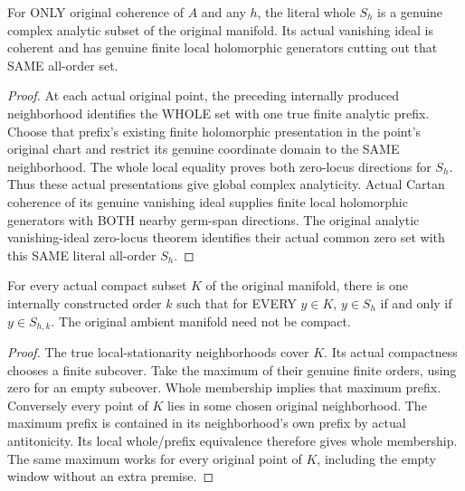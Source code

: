\begin{theorem}
\label{hir:actual-ambient-hs-whole-superlevel-analytic}
\leanok
For ONLY original coherence of $A$ and any $h$, the literal whole $S_h$
is a genuine complex analytic subset of the original manifold. Its actual
vanishing ideal is coherent and has genuine finite local holomorphic
generators cutting out that SAME all-order set.
\end{theorem}
\begin{proof}
At each actual original point, the preceding internally produced neighborhood
identifies the WHOLE set with one true finite analytic prefix. Choose that
prefix's existing finite holomorphic presentation in the point's original
chart and restrict its genuine coordinate domain to the SAME neighborhood.
The whole local equality proves both zero-locus directions for $S_h$.
Thus these actual presentations give global complex analyticity. Actual
Cartan coherence of its genuine vanishing ideal supplies finite local
holomorphic generators with BOTH nearby germ-span directions. The original
analytic vanishing-ideal zero-locus theorem identifies their actual common
zero set with this SAME literal all-order $S_h$.
\end{proof}

\begin{theorem}
\label{hir:actual-ambient-hs-whole-superlevel-compact-window-cutoff}
\leanok
For every actual compact subset $K$ of the original manifold, there is one
internally constructed order $k$ such that for EVERY $y\in K$,
$y\in S_h$ if and only if $y\in S_{h,k}$. The original ambient manifold
need not be compact.
\end{theorem}
\begin{proof}
The true local-stationarity neighborhoods cover $K$. Its actual compactness
chooses a finite subcover. Take the maximum of their genuine finite orders,
using zero for an empty subcover. Whole membership implies that maximum
prefix. Conversely every point of $K$ lies in some chosen original
neighborhood. The maximum prefix is contained in its neighborhood's own
prefix by actual antitonicity. Its local whole/prefix equivalence therefore
gives whole membership. The same maximum works for every original point
of $K$, including the empty window without an extra premise.
\end{proof}
